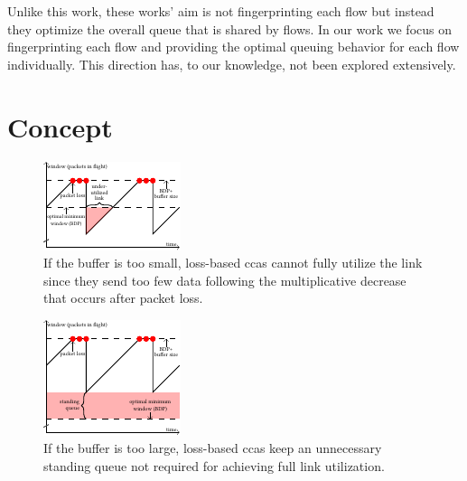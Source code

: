 \documentclass[conference]{IEEEtran}
\begin{document}
Unlike this work, these works' aim is not fingerprinting each flow but instead they optimize the overall queue that is shared by flows. In our work we focus on fingerprinting each flow and providing the optimal queuing behavior for each flow individually. This direction has, to our knowledge, not been explored extensively. 

\section{Concept}

\begin{figure}[h]
\includegraphics[width=\columnwidth]{figures/cocoa_illustration_too_little.pdf}
\caption{If the buffer is too small, loss-based \glspl{cca} cannot fully utilize the link since they send too few data following the multiplicative decrease that occurs after packet loss.}
\label{fig:tooLittle}
\end{figure}
\begin{figure}[h]
\includegraphics[width=\columnwidth]{figures/cocoa_illustration_too_much.pdf}
\caption{If the buffer is too large, loss-based \glspl{cca} keep an unnecessary standing queue not required for achieving full link utilization.}
\label{fig:tooMuch}
\end{figure}
\end{document}

